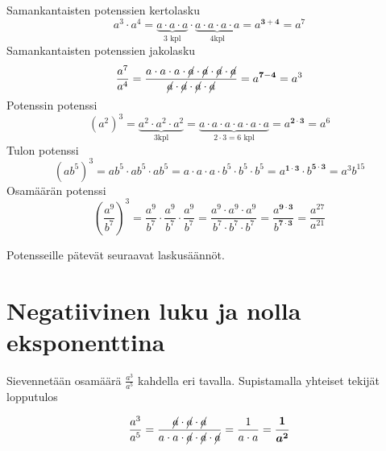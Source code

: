     Samankantaisten potenssien kertolasku
	\[
a^3\cdot a^4=\underbrace{a\cdot a\cdot a}_{\text{3 kpl}}\cdot \underbrace{a\cdot a\cdot a\cdot a}_{\text{4kpl}}=a^{\mathbf{3+4}}=a^7
    	\]
    Samankantaisten potenssien jakolasku
	\[
\frac{a^7}{a^4}=\frac{a\cdot a\cdot a\cdot \cancel{a}\cdot \cancel{a}\cdot \cancel{a}\cdot \cancel{a}}	{\cancel{a}\cdot \cancel{a}\cdot \cancel{a}\cdot \cancel{a}}=a^{\mathbf{7-4}}=a^3
    	\]
    Potenssin potenssi
	\[
(a^2)^3=\underbrace{a^2\cdot a^2\cdot a^2}_{3\text{kpl}}=\underbrace{a\cdot a\cdot a\cdot a\cdot a\cdot a}_{2\cdot 3=6\text{ kpl}}=a^{\boldsymbol{{2\cdot 3}}}=a^6
\]
    Tulon potenssi
	\[
(ab^5)^3=ab^5\cdot ab^5\cdot ab^5=a\cdot a\cdot a\cdot b^5\cdot b^5\cdot b^5=a^{\mathbf{1\cdot 3}}\cdot b^{\mathbf{5\cdot 3}}=a^3b^{15}
	\]
     Osamäärän potenssi
	\[
	\left(\frac{a^9}{b^7}\right)^3=\frac{a^9}{b^7}\cdot \frac{a^9}{b^7}\cdot \frac{a^9}{b^7}=\frac{a^9\cdot a^9\cdot a^9}{b^7\cdot b^7\cdot b^7}=\frac{a^{\mathbf{9\cdot 3}}}{b^{\mathbf{7\cdot 3}}}=\frac{a^{27}}{a^{21}}
	\]

    Potensseille pätevät seuraavat laskusäännöt.
    
    
\section*{Negatiivinen luku ja nolla eksponenttina}
    
    Sievennetään osamäärä $\frac{a^3}{a^5}$ kahdella eri tavalla. Supistamalla yhteiset tekijät lopputulos
    
    \begin{equation*}
        \frac{a^3}{a^5} =
        \frac{\cancel{a}\cdot \cancel{a}\cdot \cancel{a}}{a\cdot a\cdot
        \cancel{a}\cdot \cancel{a}\cdot \cancel{a}} = 
        \frac{1}{a\cdot a}=\boldsymbol{\frac{1}{a^2}}
    \end{equation*}
    
